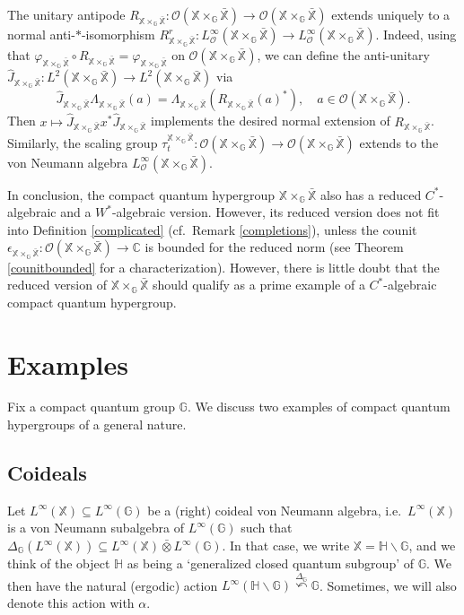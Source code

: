 \documentclass[reqno]{amsart}
\numberwithin{equation}{section}
\newcommand\XGX{\X\times_\G \bar{\X}}
\renewcommand{\H}{\mathbb{H}}
\newcommand{\mcO}{\mathcal{O}}
\newcommand{\C}{\mathbb{C}}
\newcommand{\G}{\mathbb{G}}
\newcommand{\X}{\mathbb{X}}
\newcommand{\ovot}{\bar{\otimes}}
\begin{document}
The unitary antipode $R_{\XGX}: \mcO(\XGX)\to \mcO(\XGX)$ extends uniquely to a normal anti-$*$-isomorphism $R_{\XGX}^r: L^\infty_\mcO(\XGX)\to L^\infty_\mcO(\XGX)$. Indeed, using that $\varphi_{\XGX}\circ R_{\XGX}= \varphi_{\XGX}$ on $\mcO(\XGX)$, we can define the anti-unitary
$\hat{J}_{\XGX}: L^2(\XGX)\to L^2(\XGX)$ via
$$\hat{J}_{\XGX}\Lambda_{\XGX}(a)= \Lambda_{\XGX}(R_{\XGX}(a)^*),  \quad a\in \mcO(\XGX).$$ Then $x\mapsto \hat{J}_{\XGX} x^* \hat{J}_{\XGX}$ implements the desired normal extension of $R_{\XGX}$. Similarly, the  scaling group $\tau_t^{\XGX}: \mcO(\XGX)\to \mcO(\XGX)$ extends to the von Neumann algebra $L^\infty_\mcO(\XGX)$.

In conclusion, the compact quantum hypergroup $\XGX$ also has a reduced $C^*$-algebraic and a $W^*$-algebraic version. However, its reduced version does not fit into Definition \ref{complicated} (cf.\ Remark \ref{completions}), unless the counit $\epsilon_{\XGX}:\mcO(\XGX)\to \C$ is bounded for the reduced norm (see Theorem \ref{counitbounded} for a characterization). However, there is little doubt that the reduced version of $\XGX$ should qualify as a prime example of a  $C^*$-algebraic compact quantum hypergroup.

\section{Examples}\label{examples}

Fix a compact quantum group $\G$. We discuss two examples of compact quantum hypergroups of a general nature.

\subsection{Coideals}\label{coideals}  Let $L^\infty(\X)\subseteq L^\infty(\G)$ be a (right) coideal von Neumann algebra, i.e.\ $L^\infty(\X)$ is a von Neumann subalgebra of $L^\infty(\G)$ such that $\Delta_\G(L^\infty(\X))\subseteq L^\infty(\X)\ovot L^\infty(\G)$.
In that case, we write $\X = \H \backslash \G$, and we think of the object $\H$ as being a `generalized closed quantum subgroup' of $\G$. We then have the natural (ergodic) action $L^\infty(\H\backslash \G)\stackrel{\Delta_\G}\curvearrowleft \G$. Sometimes, we will also denote this action with $\alpha$.
\end{document}
